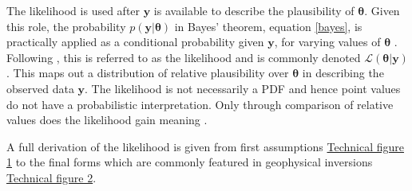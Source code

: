 The likelihood is used after $\bm{y}$ is available to describe the plausibility of $\bm{\theta}$. Given this role, the probability $p(\bm{y}|\bm{\theta})$ in Bayes' theorem, equation \ref{bayes}, is practically applied as a conditional probability given $\bm{y}$, for varying values of $\bm{\theta}$ \citep[p.10]{Box1973}. Following \citet{Fisher1922}, this is referred to as the likelihood and is commonly denoted $\mathcal{L}(\bm{\theta}|\bm{y})$. This maps out a distribution of relative plausibility over $\bm{\theta}$ in describing the observed data $\bm{y}$. The likelihood is not necessarily a PDF and hence point values do not have a probabilistic interpretation. Only through comparison of relative values does the likelihood gain meaning \citep[p.11]{Box1973}.\par


A full derivation of the likelihood is given from first assumptions \hyperref[tf1]{Technical figure 1} to the final forms which are commonly featured in geophysical inversions \hyperref[tf1]{Technical figure 2}.\par


